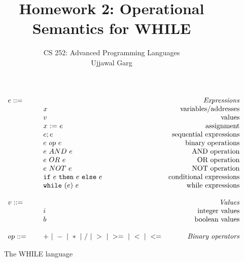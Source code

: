 \documentclass{article}
\author{
  CS 252: Advanced Programming Languages \\
  Ujjawal Garg \\
}
\title{Homework 2: Operational Semantics for WHILE}
\date{}
\begin{document}
\maketitle



\newcommand{\mydefhead}[2]{\multicolumn{2}{l}{{#1}}&\mbox{\emph{#2}}\\}
\newcommand{\mydefcase}[2]{\qquad\qquad& #1 &\mbox{#2}\\}

\newcommand{\assign}[2]{#1~{:=}~#2}
\newcommand{\ife}[3]{\mbox{\tt if}~{#1}~\mbox{\tt then}~{#2}~\mbox{\tt else}~{#3}}
\newcommand{\whilee}[2]{\mbox{\tt while}~(#1)~#2}
\newcommand{\true}{\mbox{\tt true}}
\newcommand{\false}{\mbox{\tt false}}

\newcommand{\rel}[1]{ \mbox{\sc [#1]} }
\newcommand{\ssrule}[3]{
  \rel{#1} &
  \frac{\strut\begin{array}{@{}c@{}} #2 \end{array}}
       {\strut\begin{array}{@{}c@{}} #3 \end{array}}
   \\[6pt]
}
\newcommand{\sstep}[4]{{#1},{#2} \rightarrow {#3},{#4}}

\begin{figure}[h]
\caption{The WHILE language}
\[
\begin{array}{llr}
  \mydefhead{e ::=\qquad\qquad\qquad\qquad}{Expressions}
  \mydefcase{x}{variables/addresses}
  \mydefcase{v}{values}
  \mydefcase{\assign x e}{assignment}
  \mydefcase{e; e}{sequential expressions}
  \mydefcase{e ~op~ e}{binary operations}
  \mydefcase{e ~AND~ e}{AND operation}
  \mydefcase{e ~OR~ e}{OR operation}
  \mydefcase{e ~NOT~ e}{NOT operation}
  \mydefcase{\ife e e e}{conditional expressions}
  \mydefcase{\whilee e e}{while expressions}
  \\
  \mydefhead{v ::=\qquad\qquad\qquad\qquad}{Values}
  \mydefcase{i}{integer values}
  \mydefcase{b}{boolean values}
  \\
  op ::= & + ~|~ - ~|~ * ~|~ / ~|~ > ~|~ >= ~|~ < ~|~ <=  & \mbox{\emph{Binary operators}}
\end{array}
\]
\end{figure}
\end{document}
